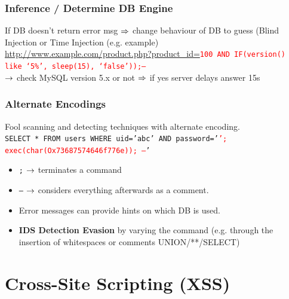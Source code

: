 \documentclass[english, leagacyboxes, nologo]{latex4ei/latex4ei_sheet}
\begin{document}
{    \subsubsection{Inference / Determine DB Engine}
      If DB doesn't return error msg $\Rightarrow$ change behaviour of DB to guess (Blind Injection or Time Injection (e.g. example)\\
      \url{http://www.example.com/product.php?product_id=}\texttt{\textcolor{red}{100 AND IF(version() like ‘5\%’, sleep(15), ‘false’));--}}\\
      $\rightarrow$ check MySQL version 5.x or not $\Rightarrow$ if yes server delays answer 15s


    \subsubsection{Alternate Encodings}
    Fool scanning and detecting techniques with alternate encoding.\\
    \texttt{SELECT * FROM users WHERE uid=’abc’ AND password=’\textcolor{red}{’; exec(char(Ox73687574646f776e)); --}'}

    \begin{itemize}
      \item \texttt{;} $\rightarrow$ terminates a command
      \item \texttt{--} $\rightarrow$ considers everything afterwards as a comment.
      \item Error messages can provide hints on which DB is used.
      \item \textbf{IDS Detection Evasion} by varying the command (e.g. through the insertion of whitespaces or comments UNION/**/SELECT)
    \end{itemize}
  }

\section*{Cross-Site Scripting (XSS)}
\end{document}
